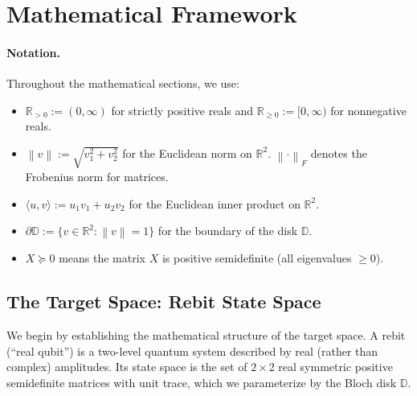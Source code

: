 \documentclass[11pt]{article}
\theoremstyle{plain}
\theoremstyle{definition}
\theoremstyle{remark}
\newcommand{\R}{\mathbb{R}}
\newcommand{\Rnn}{\mathbb{R}_{\geq 0}}  %
\newcommand{\Rpp}{\mathbb{R}_{> 0}}     %
\newcommand{\D}{\mathbb{D}}
\newcommand{\norm}[1]{\left\lVert #1 \right\rVert}
\newcommand{\fnorm}[1]{\left\lVert #1 \right\rVert_F}
\newcommand{\inner}[2]{\langle #1, #2 \rangle}
\begin{document}
\section{Mathematical Framework}
\label{sec:framework}

\paragraph{Notation.} Throughout the mathematical sections, we use:
\begin{itemize}
    \item $\Rpp := (0, \infty)$ for strictly positive reals and $\Rnn := [0, \infty)$ for nonnegative reals.
    \item $\norm{v} := \sqrt{v_1^2 + v_2^2}$ for the Euclidean norm on $\R^2$. $\fnorm{\cdot}$ denotes the Frobenius norm for matrices.
    \item $\inner{u}{v} := u_1 v_1 + u_2 v_2$ for the Euclidean inner product on $\R^2$.
    \item $\partial \D := \{v \in \R^2 : \norm{v} = 1\}$ for the boundary of the disk $\D$.
    \item $X \succeq 0$ means the matrix $X$ is positive semidefinite (all eigenvalues $\geq 0$).
\end{itemize}

\subsection{The Target Space: Rebit State Space}
\label{sec:target}

We begin by establishing the mathematical structure of the target space. A rebit (``real qubit'') is a two-level quantum system described by real (rather than complex) amplitudes. Its state space is the set of $2 \times 2$ real symmetric positive semidefinite matrices with unit trace, which we parameterize by the Bloch disk $\D$.
\end{document}
